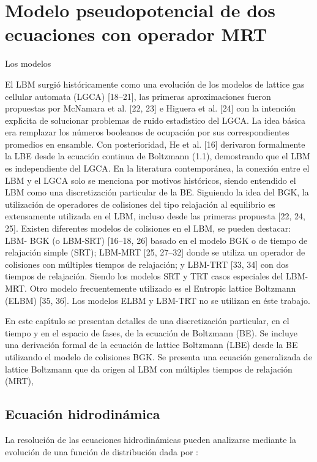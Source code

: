 \section{Modelo pseudopotencial de dos ecuaciones con operador MRT}

Los modelos 

El LBM surgió históricamente como una evolución de los modelos de lattice gas cellular
automata (LGCA) [18–21], las primeras aproximaciones fueron propuestas por McNamara
et al. [22, 23] e Higuera et al. [24] con la intención explı́cita de solucionar problemas
de ruido estadı́stico del LGCA. La idea básica era remplazar los números booleanos de
ocupación por sus correspondientes promedios en ensamble. Con posterioridad, He et
al. [16] derivaron formalmente la LBE desde la ecuación continua de Boltzmann (1.1),
demostrando que el LBM es independiente del LGCA. En la literatura contemporánea,
la conexión entre el LBM y el LGCA solo se menciona por motivos históricos, siendo
entendido el LBM como una discretización particular de la BE.
Siguiendo la idea del BGK, la utilización de operadores de colisiones del tipo relajación
al equilibrio es extensamente utilizada en el LBM, incluso desde las primeras propuesta
[22, 24, 25]. Existen diferentes modelos de colisiones en el LBM, se pueden destacar: LBM-
BGK (o LBM-SRT) [16–18, 26] basado en el modelo BGK o de tiempo de relajación simple
(SRT); LBM-MRT [25, 27–32] donde se utiliza un operador de colisiones con múltiples
tiempos de relajación; y LBM-TRT [33, 34] con dos tiempos de relajación. Siendo los
modelos SRT y TRT casos especiales del LBM-MRT. Otro modelo frecuentemente utilizado
es el Entropic lattice Boltzmann (ELBM) [35, 36]. Los modelos ELBM y LBM-TRT no se
utilizan en éste trabajo.

En este capı́tulo se presentan detalles de una discretización particular, en el tiempo y
en el espacio de fases, de la ecuación de Boltzmann (BE). Se incluye una derivación formal
de la ecuación de lattice Boltzmann (LBE) desde la BE utilizando el modelo de colisiones
BGK. Se presenta una ecuación generalizada de lattice Boltzmann que da origen al LBM
con múltiples tiempos de relajación (MRT),





\subsection{Ecuación hidrodinámica}


La resolución de las ecuaciones hidrodinámicas pueden analizarse mediante la evolución de una función de distribución dada por \cite{li2013lattice}: 	

